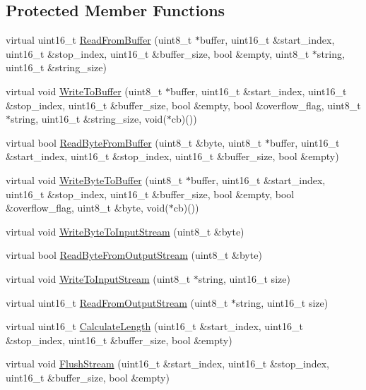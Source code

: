 \subsection*{Protected Member Functions}
\begin{DoxyCompactItemize}
\item 
virtual uint16\+\_\+t \hyperlink{class_stream_a752930f620aed4a3a80b243ce66e57ca}{Read\+From\+Buffer} (uint8\+\_\+t $\ast$buffer, uint16\+\_\+t \&start\+\_\+index, uint16\+\_\+t \&stop\+\_\+index, uint16\+\_\+t \&buffer\+\_\+size, bool \&empty, uint8\+\_\+t $\ast$string, uint16\+\_\+t \&string\+\_\+size)
\item 
virtual void \hyperlink{class_stream_ad4444f4f2a111a304bb0e25efc3a2cb2}{Write\+To\+Buffer} (uint8\+\_\+t $\ast$buffer, uint16\+\_\+t \&start\+\_\+index, uint16\+\_\+t \&stop\+\_\+index, uint16\+\_\+t \&buffer\+\_\+size, bool \&empty, bool \&overflow\+\_\+flag, uint8\+\_\+t $\ast$string, uint16\+\_\+t \&string\+\_\+size, void($\ast$cb)())
\item 
virtual bool \hyperlink{class_stream_a32e449304f65b5571fe848a503fc9d68}{Read\+Byte\+From\+Buffer} (uint8\+\_\+t \&byte, uint8\+\_\+t $\ast$buffer, uint16\+\_\+t \&start\+\_\+index, uint16\+\_\+t \&stop\+\_\+index, uint16\+\_\+t \&buffer\+\_\+size, bool \&empty)
\item 
virtual void \hyperlink{class_stream_a0da4122369b2e625c8e4a224cc598a04}{Write\+Byte\+To\+Buffer} (uint8\+\_\+t $\ast$buffer, uint16\+\_\+t \&start\+\_\+index, uint16\+\_\+t \&stop\+\_\+index, uint16\+\_\+t \&buffer\+\_\+size, bool \&empty, bool \&overflow\+\_\+flag, uint8\+\_\+t \&byte, void($\ast$cb)())
\item 
virtual void \hyperlink{class_stream_a0784d377cc92ddde7cc730be17a1a3aa}{Write\+Byte\+To\+Input\+Stream} (uint8\+\_\+t \&byte)
\item 
virtual bool \hyperlink{class_stream_a3f8e3c5513c6b8605c0fed74a3ed22bc}{Read\+Byte\+From\+Output\+Stream} (uint8\+\_\+t \&byte)
\item 
virtual void \hyperlink{class_stream_aa2f020721d273ce821ccf626e5eb773c}{Write\+To\+Input\+Stream} (uint8\+\_\+t $\ast$string, uint16\+\_\+t size)
\item 
virtual uint16\+\_\+t \hyperlink{class_stream_ab458be72cc54330f518f5ab35ab84106}{Read\+From\+Output\+Stream} (uint8\+\_\+t $\ast$string, uint16\+\_\+t size)
\item 
virtual uint16\+\_\+t \hyperlink{class_stream_a8047b62e7dcfe0e50210b3e40c7aa6eb}{Calculate\+Length} (uint16\+\_\+t \&start\+\_\+index, uint16\+\_\+t \&stop\+\_\+index, uint16\+\_\+t \&buffer\+\_\+size, bool \&empty)
\item 
virtual void \hyperlink{class_stream_a435b1b065846d3b24969cfc6dacabc6b}{Flush\+Stream} (uint16\+\_\+t \&start\+\_\+index, uint16\+\_\+t \&stop\+\_\+index, uint16\+\_\+t \&buffer\+\_\+size, bool \&empty)
\end{DoxyCompactItemize}
